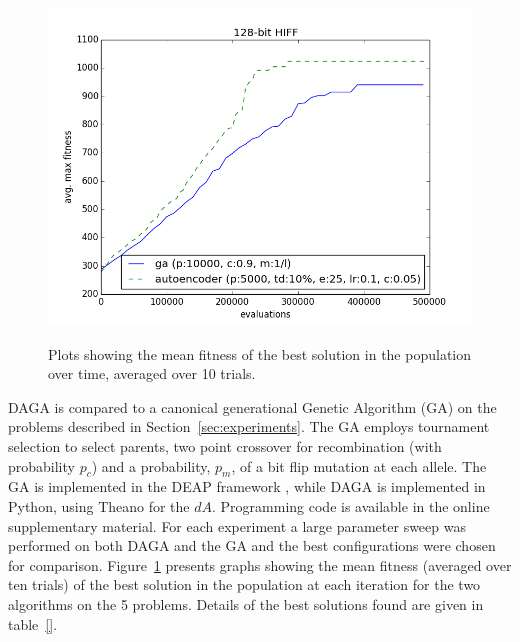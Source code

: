 \documentclass[runningheads,a4paper]{llncs}
\begin{document}
\begin{figure}[t!]
{{    \includegraphics[scale=0.35]{images/128_hiff_results.png}
    \label{fig:subfig3}
    }
}

\caption[Optional caption for list of figures]{Plots showing the mean fitness of the best solution in the population over time, averaged over 10 trials.}
\label{figure:experiment_subplots}
\end{figure}

DAGA is compared to a canonical generational Genetic Algorithm (GA) on the problems described in Section~\ref{sec:experiments}. The GA employs tournament selection to select parents, two point crossover for recombination (with probability \(p_c\)) and a probability, \(p_m\), of a bit flip mutation at each allele. The GA is implemented in the DEAP framework \cite{deap}, while DAGA is implemented in Python, using Theano for the \(dA\). Programming code is available in the online supplementary material.  For each experiment a large parameter sweep was performed on both DAGA and the GA and the best configurations were chosen for comparison. Figure~\ref{figure:experiment_subplots} presents graphs showing the mean fitness (averaged over ten trials) of the best solution in the population at each iteration for the two algorithms on the 5 problems. Details of the best solutions found are given in table~\ref{}.
\end{document}

